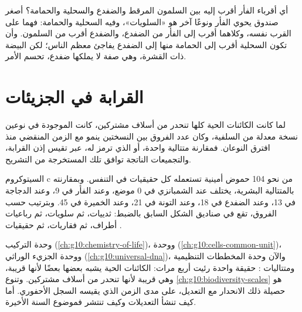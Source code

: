\begin{example}\label{ex:g10:common-ancestry:reading}
أي أقرباء الفأر أقرب إليه بين السلمون المرقط والضفدع والسحلية
والحمامة؟ أصغر صندوق يحوي الفأر ونوعًا آخر هو «السلويات»، وفيه
السحلية والحمامة: فهما على القرب نفسه، وكلاهما أقرب إلى الفأر من
الضفدع، والضفدع أقرب من السلمون. وأن تكون السحلية أقرب إلى الحمامة
منها إلى الضفدع يفاجئ معظم الناس؛ لكن البيضة ذات القشرة، وهي صفة لا
يملكها ضفدع، تحسم الأمر.
\end{example}

\section{القرابة في الجزيئات}

\begin{proposition}\label{prop:g10:common-ancestry:molecular}
لما كانت الكائنات الحية كلها تنحدر من أسلاف مشتركين، كانت 
الموجودة في نوعين نسخة معدلة من  السلفية، وكان عدد الفروق بين
النسختين ينمو مع الزمن المنقضي منذ افترق النوعان. فمقارنة متتالية
 واحدة، أو  الذي ترمز له، عبر  تقيس إذن القرابة،
والتجميعات الناتجة توافق تلك المستخرجة من التشريح.
\end{proposition}
\admitted

\begin{example}[السيتوكروم c]\label{ex:g10:common-ancestry:cytochrome}
السيتوكروم c  من نحو 104 حموض أمينية تستعمله كل حقيقيات 
في التنفس. وبمقارنته بالمتتالية البشرية، يختلف عند الشمبانزي في 0
موضع، وعند الفأر في 9، وعند الدجاجة في 13، وعند الضفدع في 18، وعند
التونة في 21، وعند الخميرة في 45. وبترتيب  حسب الفروق، تقع في
صناديق الشكل السابق بالضبط: ثدييات، ثم سلويات، ثم رباعيات أطراف، ثم
فقاريات، ثم حقيقيات .
\end{example}

\begin{remark}\label{rem:g10:common-ancestry:unity}
وحدة التركيب (\cref{ch:g10:chemistry-of-life})، ووحدة 
(\cref{ch:g10:cells-common-unit})، ووحدة الجزيء الوراثي
(\cref{ch:g10:universal-dna})، والآن وحدة المخططات التنظيمية
ومتتاليات : حقيقة واحدة رئيت أربع مرات: الكائنات الحية يشبه
بعضها بعضًا لأنها قريبة، وهي قريبة لأنها تنحدر من أسلاف مشتركين. وتنوع
\cref{ch:g10:biodiversity-scales} هو حصيلة ذلك الانحدار مع التعديل،
على مدى الزمن الذي يقيسه السجل الأحفوري. أما كيف تنشأ التعديلات وكيف
تنتشر فموضوع السنة الأخيرة.
\end{remark}

